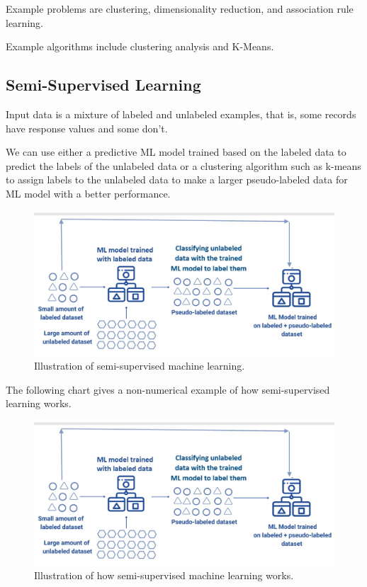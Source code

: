 \documentclass[
]{book}
\begin{document}
Example problems are clustering, dimensionality reduction, and association rule learning.

Example algorithms include clustering analysis and K-Means.

\hypertarget{semi-supervised-learning}{%
\subsection{Semi-Supervised Learning}\label{semi-supervised-learning}}

Input data is a mixture of labeled and unlabeled examples, that is, some records have response values and some don't.

We can use either a predictive ML model trained based on the labeled data to predict the labels of the unlabeled data or a clustering algorithm such as k-means to assign labels to the unlabeled data to make a larger pseudo-labeled data for ML model with a better performance.

\begin{figure}

{\centering \includegraphics[width=0.8\linewidth]{img07/w07-semi-superised} 

}

\caption{Illustration of semi-supervised machine learning.}\label{fig:unnamed-chunk-138}
\end{figure}

The following chart gives a non-numerical example of how semi-supervised learning works.

\begin{figure}

{\centering \includegraphics[width=0.8\linewidth]{img07/w07-semi-superised} 

}

\caption{Illustration of how semi-supervised machine learning works.}\label{fig:unnamed-chunk-139}
\end{figure}
\end{document}
